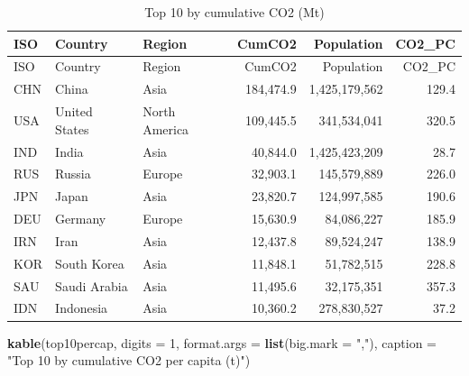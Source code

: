 \documentclass[
]{article}
\newenvironment{Shaded}{\begin{snugshade}}{\end{snugshade}}
\newcommand{\AttributeTok}[1]{\textcolor[rgb]{0.13,0.29,0.53}{#1}}
\newcommand{\DecValTok}[1]{\textcolor[rgb]{0.00,0.00,0.81}{#1}}
\newcommand{\FunctionTok}[1]{\textcolor[rgb]{0.13,0.29,0.53}{\textbf{#1}}}
\newcommand{\NormalTok}[1]{#1}
\newcommand{\StringTok}[1]{\textcolor[rgb]{0.31,0.60,0.02}{#1}}
\begin{document}
\begin{longtable}[]{@{}lllrrr@{}}
\caption{Top 10 by cumulative CO2 (Mt)}\tabularnewline
\toprule\noalign{}
ISO & Country & Region & CumCO2 & Population & CO2\_PC \\
\midrule\noalign{}
\endfirsthead
\toprule\noalign{}
ISO & Country & Region & CumCO2 & Population & CO2\_PC \\
\midrule\noalign{}
\endhead
\bottomrule\noalign{}
\endlastfoot
CHN & China & Asia & 184,474.9 & 1,425,179,562 & 129.4 \\
USA & United States & North America & 109,445.5 & 341,534,041 & 320.5 \\
IND & India & Asia & 40,844.0 & 1,425,423,209 & 28.7 \\
RUS & Russia & Europe & 32,903.1 & 145,579,889 & 226.0 \\
JPN & Japan & Asia & 23,820.7 & 124,997,585 & 190.6 \\
DEU & Germany & Europe & 15,630.9 & 84,086,227 & 185.9 \\
IRN & Iran & Asia & 12,437.8 & 89,524,247 & 138.9 \\
KOR & South Korea & Asia & 11,848.1 & 51,782,515 & 228.8 \\
SAU & Saudi Arabia & Asia & 11,495.6 & 32,175,351 & 357.3 \\
IDN & Indonesia & Asia & 10,360.2 & 278,830,527 & 37.2 \\
\end{longtable}

\begin{Shaded}
\begin{Highlighting}[]
\FunctionTok{kable}\NormalTok{(top10percap, }\AttributeTok{digits =} \DecValTok{1}\NormalTok{, }\AttributeTok{format.args =} \FunctionTok{list}\NormalTok{(}\AttributeTok{big.mark =} \StringTok{","}\NormalTok{),}
      \AttributeTok{caption =} \StringTok{"Top 10 by cumulative CO2 per capita (t)"}\NormalTok{)}
\end{Highlighting}
\end{Shaded}
\end{document}
